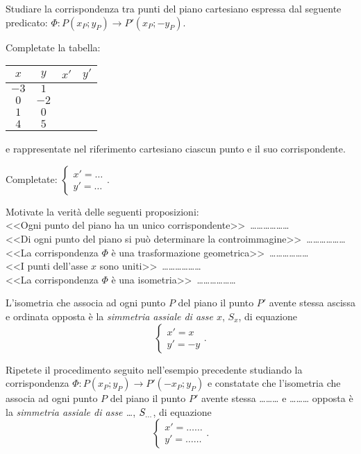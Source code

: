 \begin{exrig}
\begin{esempio}
Studiare la corrispondenza tra punti del piano cartesiano espressa 
dal seguente predicato: $\Phi:P(x_P;y_P) \rightarrow 
P'(x_P;-y_P)$.\vspace{7pt}

Completate la tabella: 
\begin{center}
\begin{tabular}{cccc}
\toprule
$x$ & $y$ & $x'$ & $y'$\\
\midrule
$-3$ & $1$ &  &  \\
$0$ & $-2$ &  &  \\
$1$ & $0$ & &  \\
$4$ & $5$ & &  \\
\bottomrule
\end{tabular}
\end{center}

\noindent e rappresentate nel riferimento cartesiano ciascun punto e 
il suo corrispondente.

Completate: $\begin{cases}x'=\ldots{} \\ y'=\ldots{}\end{cases}$.

Motivate la verità delle seguenti proposizioni:\\
<<Ogni punto del piano ha un unico 
corrispondente>>~\ldots\ldots\ldots\ldots\ldots\ldots{}\\
<<Di ogni punto del piano si può determinare la 
controimmagine>>~\ldots\ldots\ldots\ldots\ldots\ldots{}\\
<<La corrispondenza $\Phi$ è una trasformazione 
geometrica>>~\ldots\ldots\ldots\ldots\ldots\ldots{}\\
<<I punti dell'asse $x$ sono 
uniti>>~\ldots\ldots\ldots\ldots\ldots\ldots{}\\
<<La corrispondenza $\Phi$ è una 
isometria>>~\ldots\ldots\ldots\ldots\ldots\ldots{}
\end{esempio}
\end{exrig}

L'isometria che associa ad ogni punto $P$ del piano il punto $P'$ 
avente stessa ascissa e ordinata opposta è la \emph{simmetria assiale 
di asse $x$}, $S_x$, di equazione
\[\begin{cases}x'=x\\ y'=-y\end{cases}.\]
 
Ripetete il procedimento seguito nell'esempio precedente studiando la 
corrispondenza $\Phi:P(x_P;y_P) \rightarrow P'(-x_P;y_P)$ e 
constatate che l'isometria che associa ad ogni punto $P$ del piano il 
punto $P'$ avente stessa \ldots\ldots\ldots{} e \ldots\ldots\ldots{} 
opposta è la \emph{simmetria assiale di asse \ldots{}}, 
$S_{\vphantom{k}\ldots{}}$, di equazione
\[\begin{cases}x'=\ldots\ldots{}\\ y'=\ldots\ldots{}\end{cases}.\]


